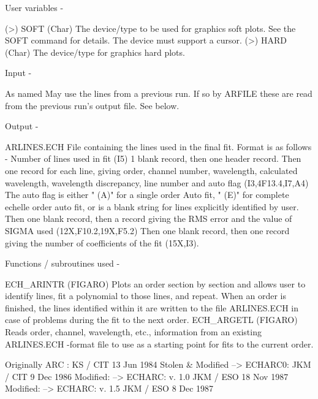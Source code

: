 \begin{description}
\begin{description}
\begin{terminalv}
 User variables -

 (>) SOFT     (Char) The device/type to be used for graphics
              soft plots.  See the SOFT command for details.
              The device must support a cursor.
 (>) HARD     (Char) The device/type for graphics hard plots.

 Input -

 As named     May use the lines from a previous run.  If so
 by ARFILE    these are read from the previous run's output
              file.  See below.

 Output -

 ARLINES.ECH  File containing the lines used in the final fit.
              Format is as follows -
              Number of lines used in fit (I5)
              1 blank record, then one header record.
              Then one record for each line, giving order, channel
              number, wavelength, calculated wavelength, wavelength
              discrepancy, line number and auto flag (I3,4F13.4,I7,A4)
              The auto flag is either " (A)" for a single order Auto
              fit, " (E)" for complete echelle order auto fit, or is
              a blank string for lines explicitly identified by user.
              Then one blank record, then a record giving the RMS
              error and the value of SIGMA used (12X,F10.2,19X,F5.2)
              Then one blank record, then one record giving the
              number of coefficients of the fit (15X,I3).

 Functions / subroutines used -

 ECH_ARINTR  (FIGARO)  Plots an order section by section and
                       allows user to identify lines, fit a
                       polynomial to those lines, and repeat.
                       When an order is finished, the lines
                       identified within it are written to
                       the file ARLINES.ECH in case of problems
                       during the fit to the next order.
 ECH_ARGETL  (FIGARO)  Reads order, channel, wavelength, etc.,
                       information from an existing ARLINES.ECH
                       -format file to use as a starting point
                       for fits to the current order.

 Originally  ARC :                             KS / CIT 13 Jun 1984
 Stolen & Modified --> ECHARC0:               JKM / CIT  9 Dec 1986
 Modified:         --> ECHARC:  v. 1.0        JKM / ESO 18 Nov 1987
 Modified:         --> ECHARC:  v. 1.5        JKM / ESO  8 Dec 1987
\end{terminalv}
\end{description}

\end{description}
